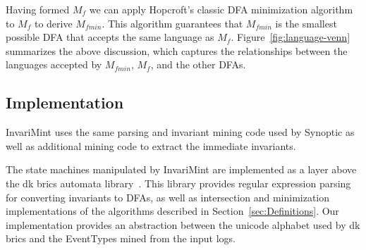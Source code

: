 Having formed $M_f$ we can apply Hopcroft's classic DFA minimization
algorithm to $M_f$ to derive
$M_{f min}$. This algorithm guarantees that $M_{f min}$ is the smallest possible
DFA that accepts the same language as $M_f$. Figure~\ref{fig:language-venn}
summarizes the above discussion, which captures the
relationships between the languages accepted by $M_{f min}$,
$M_f$, and the other DFAs.

\subsection{Implementation}
\label{sec:implementation}

InvariMint uses the same parsing and invariant mining code used by Synoptic as
well as additional mining code to extract the immediate invariants.

The state machines manipulated by InvariMint are implemented as a layer above
the dk brics automata library~\cite{automaton}. This library provides regular expression parsing for
converting invariants to DFAs, as well as intersection and minimization
implementations of the algorithms described in Section~\ref{sec:Definitions}.
Our implementation provides an abstraction between the unicode alphabet
used by dk brics and the EventTypes mined from the input logs.
